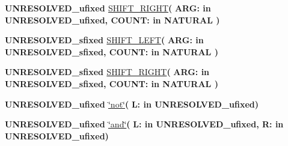 \begin{DoxyCompactItemize}
\item 
{\bfseries {\bfseries \textcolor{vhdlchar}{U\+N\+R\+E\+S\+O\+L\+V\+E\+D\+\_\+ufixed}\textcolor{vhdlchar}{ }}} \hyperlink{class__fixed__pkg_a4902245efcebf3b6e6566fdecdbe1332}{S\+H\+I\+F\+T\+\_\+\+R\+I\+G\+H\+T}{\bfseries  ( }{\bfseries \textcolor{vhdlchar}{A\+R\+G\+: }\textcolor{stringliteral}{in }\textcolor{vhdlchar}{U\+N\+R\+E\+S\+O\+L\+V\+E\+D\+\_\+ufixed}}{\bfseries  , \textcolor{vhdlchar}{C\+O\+U\+N\+T\+: }\textcolor{stringliteral}{in }{\bfseries \textcolor{comment}{N\+A\+T\+U\+R\+A\+L}\textcolor{vhdlchar}{ }}}{\bfseries  )} 
\item 
{\bfseries {\bfseries \textcolor{vhdlchar}{U\+N\+R\+E\+S\+O\+L\+V\+E\+D\+\_\+sfixed}\textcolor{vhdlchar}{ }}} \hyperlink{class__fixed__pkg_ae2ad89e91560b8c2ae7c0526eb1c1fa2}{S\+H\+I\+F\+T\+\_\+\+L\+E\+F\+T}{\bfseries  ( }{\bfseries \textcolor{vhdlchar}{A\+R\+G\+: }\textcolor{stringliteral}{in }\textcolor{vhdlchar}{U\+N\+R\+E\+S\+O\+L\+V\+E\+D\+\_\+sfixed}}{\bfseries  , \textcolor{vhdlchar}{C\+O\+U\+N\+T\+: }\textcolor{stringliteral}{in }{\bfseries \textcolor{comment}{N\+A\+T\+U\+R\+A\+L}\textcolor{vhdlchar}{ }}}{\bfseries  )} 
\item 
{\bfseries {\bfseries \textcolor{vhdlchar}{U\+N\+R\+E\+S\+O\+L\+V\+E\+D\+\_\+sfixed}\textcolor{vhdlchar}{ }}} \hyperlink{class__fixed__pkg_a5265a9d5e30365fb9abf08ca05c66687}{S\+H\+I\+F\+T\+\_\+\+R\+I\+G\+H\+T}{\bfseries  ( }{\bfseries \textcolor{vhdlchar}{A\+R\+G\+: }\textcolor{stringliteral}{in }\textcolor{vhdlchar}{U\+N\+R\+E\+S\+O\+L\+V\+E\+D\+\_\+sfixed}}{\bfseries  , \textcolor{vhdlchar}{C\+O\+U\+N\+T\+: }\textcolor{stringliteral}{in }{\bfseries \textcolor{comment}{N\+A\+T\+U\+R\+A\+L}\textcolor{vhdlchar}{ }}}{\bfseries  )} 
\item 
{\bfseries {\bfseries \textcolor{vhdlchar}{U\+N\+R\+E\+S\+O\+L\+V\+E\+D\+\_\+ufixed}\textcolor{vhdlchar}{ }}} \hyperlink{class__fixed__pkg_aa6c22e56a32fa4d4cece3c49aface404}{\char`\"{}not\char`\"{}}{\bfseries  ( }{\bfseries \textcolor{vhdlchar}{L\+: }\textcolor{stringliteral}{in }\textcolor{vhdlchar}{U\+N\+R\+E\+S\+O\+L\+V\+E\+D\+\_\+ufixed}}{\bfseries  )} 
\item 
{\bfseries {\bfseries \textcolor{vhdlchar}{U\+N\+R\+E\+S\+O\+L\+V\+E\+D\+\_\+ufixed}\textcolor{vhdlchar}{ }}} \hyperlink{class__fixed__pkg_a0f83c10da0a17e853c8c2dea4a5685db}{\char`\"{}and\char`\"{}}{\bfseries  ( }{\bfseries \textcolor{vhdlchar}{L\+: }\textcolor{stringliteral}{in }\textcolor{vhdlchar}{U\+N\+R\+E\+S\+O\+L\+V\+E\+D\+\_\+ufixed}}{\bfseries  , \textcolor{vhdlchar}{R\+: }\textcolor{stringliteral}{in }\textcolor{vhdlchar}{U\+N\+R\+E\+S\+O\+L\+V\+E\+D\+\_\+ufixed}}{\bfseries  )} 

\end{DoxyCompactItemize}
